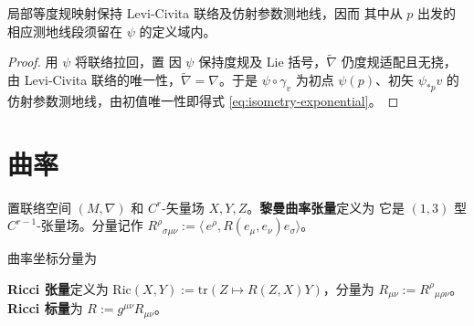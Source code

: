 \begin{theorem}\label{thm:isometry-connection-geodesics}
    局部等度规映射保持 Levi-Civita 联络及仿射参数测地线，因而
    其中从 $p$ 出发的相应测地线段须留在 $\psi$ 的定义域内。
\end{theorem}
\begin{proof}
    用 $\psi$ 将联络拉回，置
    因 $\psi$ 保持度规及 Lie 括号，$\widetilde\nabla$ 仍度规适配且无挠，由 Levi-Civita 联络的唯一性，$\widetilde\nabla=\nabla$。于是 $\psi\circ\gamma_v$ 为初点 $\psi(p)$、初矢 $\psi_{*p}v$ 的仿射参数测地线，由初值唯一性即得式 \eqref{eq:isometry-exponential}。
\end{proof}

\section{曲率}\label{sec:appendix-curvature}

\begin{definition}
    置联络空间 $(M,\nabla)$ 和 $C^r$-矢量场 $X,Y,Z$。\textbf{黎曼曲率张量}定义为
    它是 $(1,3)$ 型 $C^{r-1}$-张量场。分量记作 $R^\rho{}_{\sigma\mu\nu}:=\langle\,e^\rho,R(e_\mu,e_\nu)e_\sigma\rangle$。
\end{definition}

\begin{theorem}
    曲率坐标分量为
\end{theorem}

\begin{definition}
    \textbf{Ricci 张量}定义为 $\mathrm{Ric}(X,Y):=\mathrm{tr}(Z\mapsto R(Z,X)Y)$，分量为 $R_{\mu\nu}:=R^\rho{}_{\mu\rho\nu}$。
    \textbf{Ricci 标量}为 $R:=g^{\mu\nu}R_{\mu\nu}$。
\end{definition}

